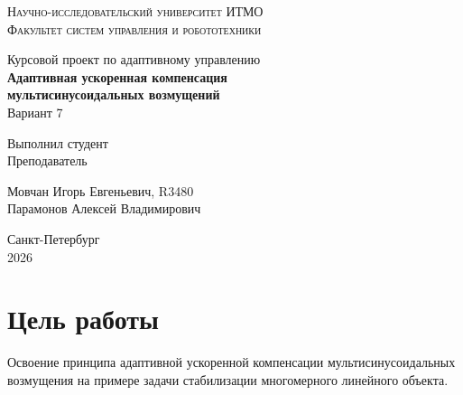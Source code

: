 \documentclass[a4paper,hidelinks,14pt]{extarticle}
\begin{document}
	\begin{titlepage}
		\setlength{\parindent}{0ex}
		
		\begin{center}
			\textsc{
				\vspace{1ex}
                Научно-исследовательский университет ИТМО \\
				\vspace{0.5ex}
				Факультет систем управления и робототехники \\
				\vspace{0.5ex}
			}
		\end{center}
		
		\vspace{40mm}
		
		\begin{center}
			Курсовой проект по адаптивному управлению \\[0.5ex]
			\textbf{Адаптивная ускоренная компенсация \\
			мультисинусоидальных возмущений} \\[0.5ex]
			Вариант 7
		\end{center}

		
		\vspace{46mm}
		
		\begin{minipage}{.45\linewidth}
			Выполнил студент
            \\
			Преподаватель
		\end{minipage}
		\hfill
		\begin{minipage}{.52\linewidth}
			\begin{flushright}
				Мовчан Игорь Евгеньевич, R3480
				\\
				Парамонов Алексей Владимирович
			\end{flushright}
		\end{minipage}
		
		\vfill
		\begin{center}
			Санкт-Петербург
			\\
			2026
		\end{center}
		
	\end{titlepage}

	\tableofcontents
	\clearpage
	
	\section{Цель работы}
	Освоение принципа адаптивной ускоренной компенсации мультисинусоидальных возмущения на примере задачи стабилизации многомерного линейного объекта.
	
\end{document}
